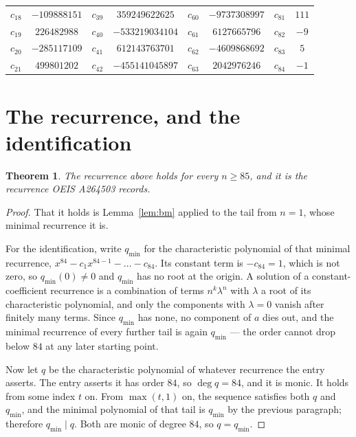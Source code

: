 \documentclass[11pt,a4paper]{article}
\theoremstyle{plain}
\newtheorem{theorem}{Theorem}
\theoremstyle{definition}
\begin{document}
\begin{center}
\begin{tabular}{cccccccc}
$c_{18}$ & $-109888151$ & $c_{39}$ & $359249622625$ & $c_{60}$ & $-9737308997$ & $c_{81}$ & $111$ \\
$c_{19}$ & $226482988$ & $c_{40}$ & $-533219034104$ & $c_{61}$ & $6127665796$ & $c_{82}$ & $-9$ \\
$c_{20}$ & $-285117109$ & $c_{41}$ & $612143763701$ & $c_{62}$ & $-4609868692$ & $c_{83}$ & $5$ \\
$c_{21}$ & $499801202$ & $c_{42}$ & $-455141045897$ & $c_{63}$ & $2042976246$ & $c_{84}$ & $-1$ \\
\end{tabular}
\end{center}

\section{The recurrence, and the identification}

\begin{theorem}
The recurrence above holds for every $n\ge85$, and it is the recurrence OEIS A264503 records.
\end{theorem}

\begin{proof}
That it holds is Lemma~\ref{lem:bm} applied to the tail from $n=1$, whose minimal
recurrence it is.

For the identification, write $q_{\min}$ for the characteristic polynomial of that minimal
recurrence, $x^{84}-c_1x^{84-1}-\dots-c_{84}$. Its constant term is
$-c_{84}=1$, which is not zero, so $q_{\min}(0)\neq0$ and $q_{\min}$ has no
root at the origin. A solution of a constant-coefficient recurrence is a combination of terms
$n^{k}\lambda^{n}$ with $\lambda$ a root of its characteristic polynomial, and only the
components with $\lambda=0$ vanish after finitely many terms. Since $q_{\min}$ has none, no
component of $a$ dies out, and the minimal recurrence of every further tail is again
$q_{\min}$ --- the order cannot drop below $84$ at any later starting point.

Now let $q$ be the characteristic polynomial of whatever recurrence the entry asserts. The
entry asserts it has order $84$, so $\deg q=84$, and it is monic. It holds from some
index $t$ on. From $\max(t,1)$ on, the sequence satisfies both $q$ and $q_{\min}$, and
the minimal polynomial of that tail is $q_{\min}$ by the previous paragraph; therefore
$q_{\min}\mid q$. Both are monic of degree $84$, so $q=q_{\min}$.
\end{proof}
\end{document}
